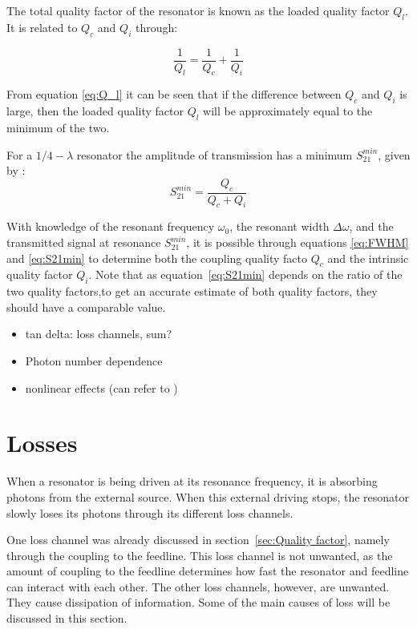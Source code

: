 \documentclass[12pt]{report}
\begin{document}
The total quality factor of the resonator is known as the loaded quality factor $Q_l$. It is related to $Q_c$ and $Q_i$ through:

\begin{equation}
    \frac{1}{Q_l} = \frac{1}{Q_c} + \frac{1}{Q_i}
    \label{eq:Q_l}
\end{equation}

From equation \ref{eq:Q_l} it can be seen that if the difference between $Q_c$ and $Q_i$ is large, then the loaded quality factor $Q_l$ will be approximately equal to the minimum of the two.


For a $1/4 - \lambda$ resonator the amplitude of transmission has a minimum $S_{21}^{min}$, given by \cite[p.~29]{Mazin}:
\begin{equation}
    S_{21}^{min} = \frac{Q_c}{Q_c + Q_i}
    \label{eq:S21min}
\end{equation}

With knowledge of the resonant frequency $\omega_0$, the resonant width $\Delta \omega$, and the transmitted signal at resonance $S_{21}^{min}$, it is possible through equations \ref{eq:FWHM} and \ref{eq:S21min} to determine both the coupling quality facto $Q_c$ and the intrinsic quality factor $Q_i$. Note that as equation~\ref{eq:S21min} depends on the ratio of the two quality factors,to get an accurate estimate of both quality factors, they should have a comparable value.

\begin{itemize}
    \item tan delta: loss channels, sum?
    \item Photon number dependence
    \item nonlinear effects (can refer to \cite{abdo2006nonlinear})
\end{itemize}





\section{Losses}

When a resonator is being driven at its resonance frequency, it is absorbing photons from the external source. When this external driving stops, the resonator slowly loses its photons through its different loss channels.

One loss channel was already discussed in section~\ref{sec:Quality factor}, namely through the coupling to the feedline. This loss channel is not unwanted, as the amount of coupling to the feedline determines how fast the resonator and feedline can interact with each other. The other loss channels, however, are unwanted. They cause dissipation of information. Some of the main causes of loss will be discussed in this section.
\end{document}
